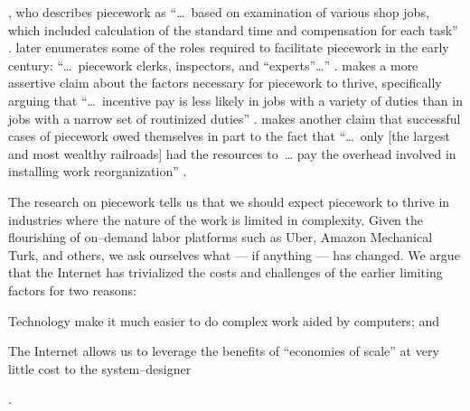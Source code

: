 \documentclass[trackingWork]{subfiles}
\begin{document}
\citeauthor{10.2307/23702539},
who describes piecework as
    ``\dots~based on examination of various shop jobs,
    which included calculation of the standard time and compensation for each task''
\cite{10.2307/23702539}.
\citeauthor{10.2307/23702539} later enumerates some of the roles required
to facilitate piecework in the early  century:
    ``\dots~piecework clerks, inspectors, and ``experts''\dots''
\cite{10.2307/23702539}.
\citeauthor{Brown01041990} makes a more assertive
claim about the factors necessary for piecework to thrive,
specifically arguing that
    ``\dots~incentive pay is less likely in jobs with
    a variety of duties than in jobs with a narrow set of routinized duties''
\cite{Brown01041990}.
\citeauthor{10.2307/23702539} makes another claim that
successful cases of piecework owed themselves in part to the fact that
    ``\dots~only [the largest and most wealthy railroads] had the resources to~\dots
    pay the overhead involved in installing work reorganization''
\cite{10.2307/23702539}.

The research on piecework tells us that
we should expect piecework to thrive in industries where
the nature of the work is limited in complexity.
Given the flourishing of on--demand labor platforms such as
Uber, Amazon Mechanical Turk, and others, we ask ourselves
what --- if anything --- has changed.
We argue that the Internet has trivialized the costs and challenges of the earlier limiting factors for two reasons:
\begin{inlinelist}
  \item Technology make it much easier to do complex work aided by computers; and %
  \item The Internet allows us to leverage the benefits of ``economies of scale'' at very little cost
        to the system--designer \cite{lessig2006code}
\end{inlinelist}.





\end{document}
